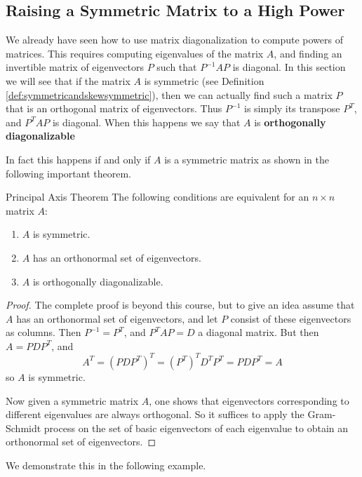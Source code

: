 \subsection{Raising a Symmetric Matrix to a High Power}

We already have seen how to use matrix diagonalization to compute
powers of matrices. This requires computing eigenvalues of the matrix
$A$, and finding an invertible matrix of eigenvectors $P$ such that
$P^{-1}AP$ is diagonal. In this section we will see that if the matrix
$A$ is symmetric (see Definition \ref{def:symmetricandskewsymmetric}),
then we can actually find such a matrix $P$ that is an orthogonal
matrix of eigenvectors. Thus $P^{-1}$ is simply its transpose
$P^T$, and $P^TAP$ is diagonal. When this happens we say that $A$ is
\textbf{orthogonally diagonalizable}

In fact this happens if and only if $A$ is a symmetric matrix as
shown in the following important theorem.

\begin{theorem}{Principal Axis Theorem}\label{thm:principalaxis}
The following conditions are equivalent for an $n \times n$ matrix $A$:
\begin{enumerate}
\item $A$ is symmetric. 
\item $A$ has an orthonormal set of eigenvectors. 
\item $A$ is  orthogonally diagonalizable.
\end{enumerate}
\end{theorem}

\begin{proof}
The complete proof is beyond this course, but to give an idea assume
that $A$ has an orthonormal set of eigenvectors, and let $P$ consist
of these eigenvectors as columns. Then $P^{-1}=P^T$, and $P^TAP=D$ a diagonal matrix. But then $A=PDP^T$, and
\[ A^T=(PDP^T)^T = (P^T)^TD^TP^T=PDP^T=A\]
so $A$ is symmetric. 

Now given a symmetric matrix $A$, one shows that eigenvectors
corresponding to different eigenvalues are always orthogonal. So it
suffices to apply the Gram-Schmidt process on the set of basic
eigenvectors of each eigenvalue to obtain an orthonormal set of eigenvectors. 
\end{proof}

We demonstrate this in the following example. 

